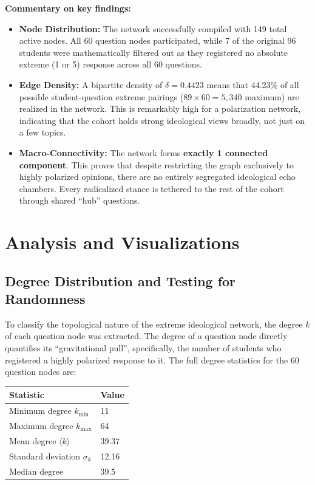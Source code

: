 \documentclass[11pt, a4paper]{article}
\begin{document}
\textbf{Commentary on key findings:}
\begin{itemize}
    \item \textbf{Node Distribution:} The network successfully compiled with 149 total active nodes. All 60 question nodes participated, while 7 of the original 96 students were mathematically filtered out as they registered no absolute extreme (1 or 5) response across all 60 questions.
    \item \textbf{Edge Density:} A bipartite density of $\delta = 0.4423$ means that 44.23\% of all possible student-question extreme pairings ($89 \times 60 = 5{,}340$ maximum) are realized in the network. This is remarkably high for a polarization network, indicating that the cohort holds strong ideological views broadly, not just on a few topics.
    \item \textbf{Macro-Connectivity:} The network forms \textbf{exactly 1 connected component}. This proves that despite restricting the graph exclusively to highly polarized opinions, there are no entirely segregated ideological echo chambers. Every radicalized stance is tethered to the rest of the cohort through shared ``hub'' questions.
\end{itemize}

\section{Analysis and Visualizations}

\subsection{Degree Distribution and Testing for Randomness}

To classify the topological nature of the extreme ideological network, the degree $k$ of each question node was extracted. The degree of a question node directly quantifies its ``gravitational pull'', specifically, the number of students who registered a highly polarized response to it. The full degree statistics for the 60 question nodes are:

\begin{center}
\begin{tabular}{ll}
\toprule
\textbf{Statistic} & \textbf{Value} \\
\midrule
Minimum degree $k_{\min}$ & 11 \\
Maximum degree $k_{\max}$ & 64 \\
Mean degree $\langle k \rangle$ & 39.37 \\
Standard deviation $\sigma_k$ & 12.16 \\
Median degree & 39.5 \\
\bottomrule
\end{tabular}
\end{center}
\end{document}
